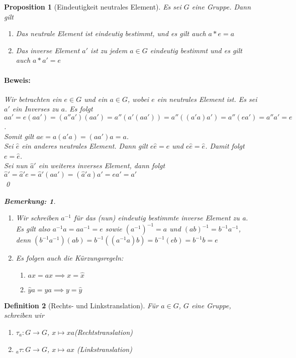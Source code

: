 \documentclass{report}
\newcommand{\IN}[1]{\index{#1|BH}}
\theoremstyle{customrem}
\newtheorem*{bemerkung}{Bemerkung\textnormal:}
\theoremstyle{customdef}
\newtheorem{definition}{Definition}[chapter]
\newtheorem{proposition}[definition]{Proposition}
\renewenvironment{proof}{\paragraph{Beweis: }}{\qed}
\begin{document}
	\begin{proposition}[Eindeutigkeit neutrales Element]
		Es sei $G$ eine Gruppe. Dann gilt
		\begin{enumerate}
			\itemsep0cm
			\item Das neutrale Element ist eindeutig bestimmt, und es gilt auch $a \ast e = a$
			\item Das inverse Element $a'$ ist zu jedem $a \in G$ eindeutig bestimmt und es gilt auch $a \ast a' = e$
		\end{enumerate}
		\vspace{.25cm}
		\begin{proof}
			Wir betrachten ein $e \in G$ und ein $a \in G$, wobei $e$ ein neutrales Element ist. Es sei $a'$ ein Inverses zu $a$. Es folgt 
			$a a' = e (a a') = (a'' a') (a a') = a'' (a' (a a')) = a'' ((a' a) a') = a'' (e a') = a'' a' = e$.\\
			Somit gilt $a e = a (a' a) = (a a') a = a$.\\
			Sei $\hat{e}$ ein anderes neutrales Element. Dann gilt $e \hat{e} = e$ und $e \hat{e} = \hat{e}$. Damit folgt $e = \hat{e}$.\\
			Sei nun $\hat{a}'$ ein weiteres inverses Element, dann folgt 
			$\hat{a}' = \hat{a}' e = \hat{a}' (aa') = (\hat{a}'a)a' = ea' = a'$\\
		\end{proof}\vspace{.25cm}
		\begin{bemerkung} $ $
			\begin{enumerate}
				\itemsep0cm
				\item Wir schreiben $a^{-1}$ für das (nun) eindeutig bestimmte inverse Element zu a.
				Es gilt also $a^{-1}a = aa^{-1} = e$ sowie $(a^{-1})^{-1} = a$ und $(ab)^{-1} = b^{-1}a^{-1}$, denn $(b^{-1}a^{-1})(ab) = b^{-1}((a^{-1}a)b) = b^{-1}(eb) = b^{-1}b = e$
				\item Es folgen auch die Kürzungsregeln:
				\begin{enumerate}[leftmargin=3cm]
					\itemsep0cm
					\item $a \hat{x} = ax \implies x = \hat{x}$
					\item $\hat{y}a = ya \implies y = \hat{y}$
				\end{enumerate}
			\end{enumerate}
		\end{bemerkung}
	\end{proposition}
	
	\begin{definition}[Rechts- und Linkstranslation]
		\IN{Gruppe!Translation}
		Für $a \in G$, $G$ eine Gruppe, schreiben wir
		\begin{enumerate}[leftmargin=5cm, rightmargin=4cm]
			\item $\tau_a : G \to G$, $x \mapsto x a$\hfill (Rechtstranslation)
			\item $_{a}\tau : G \to G$, $x \mapsto a x$ \hfill (Linkstranslation)
		\end{enumerate}
	\end{definition}
	
\end{document}
